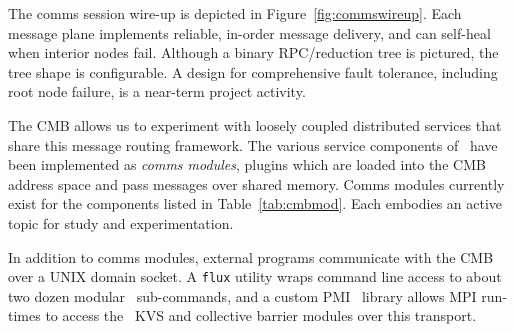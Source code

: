 The comms session wire-up is depicted in Figure~\ref{fig:commswireup}.
Each message plane implements reliable, in-order message delivery, and
can self-heal when interior nodes fail.
Although a binary RPC/reduction tree is pictured, the tree shape is
configurable.
A design for comprehensive fault tolerance, including root node failure,
is a near-term project activity.

The CMB allows us to experiment with loosely coupled distributed services
that share this message routing framework. The various service components
of \flux\ have
been implemented as {\em comms modules}, plugins which are loaded into the
CMB address space and pass messages over shared memory.
Comms modules currently exist for the components listed
in Table~\ref{tab:cmbmod}.
Each embodies an active topic for study and experimentation.

In addition to comms modules, external programs communicate with the CMB
over a UNIX domain socket.  A {\tt flux} utility wraps command line access
to about two dozen modular \flux\ sub-commands, and a custom PMI~\cite{PMI2}
library allows MPI run-times to access the \flux\ KVS and collective barrier
modules over this transport.

